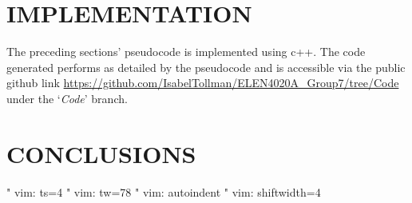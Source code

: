 \section{IMPLEMENTATION}
The preceding sections' pseudocode is implemented using c++. The code generated performs as detailed by the pseudocode and is accessible via the public github link \url{https://github.com/IsabelTollman/ELEN4020A_Group7/tree/Code} under the `\emph{Code}' branch.

\section{CONCLUSIONS}


\cite{1}
 







" vim: ts=4
" vim: tw=78
" vim: autoindent
" vim: shiftwidth=4
